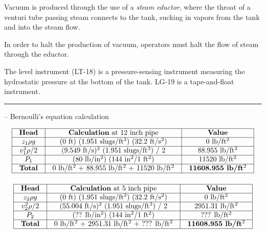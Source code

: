 Vacuum is produced through the use of a {\it steam eductor}, where the throat of a venturi tube passing steam connects to the tank, sucking in vapors from the tank and into the steam flow.  

\vskip 10pt

In order to halt the production of vacuum, operators must halt the flow of steam through the eductor.

\vskip 10pt

The level instrument (LT-18) is a pressure-sensing instrument measuring the hydrostatic pressure at the bottom of the tank.  LG-19 is a tape-and-float instrument.


\filbreak \vskip 5pt \hrule \vskip 5pt  -- Bernoulli's equation calculation \vskip 10pt


$$\vbox{\offinterlineskip
\halign{\strut
\vrule \quad\hfil # \ \hfil & 
\vrule \quad\hfil # \ \hfil & 
\vrule \quad\hfil # \ \hfil \vrule \cr
\noalign{\hrule}
%
{\bf Head} & {\bf Calculation} at 12 inch pipe & {\bf Value} \cr
%
\noalign{\hrule}
%
$z_1 \rho g$ & (0 ft) (1.951 slugs/ft$^{3}$) (32.2 ft/s$^{2}$) & 0 lb/ft$^{2}$ \cr
%
\noalign{\hrule}
%
$v_1^2 \rho / 2$ & (9.549 ft/s)$^{2}$ (1.951 slugs/ft$^{3}$) / 2 & 88.955 lb/ft$^{2}$ \cr
%
\noalign{\hrule}
%
$P_1$ & (80 lb/in$^{2}$) (144 in$^{2}$/1 ft$^{2}$) & 11520 lb/ft$^{2}$ \cr
%
\noalign{\hrule}
%
{\bf Total} &  0 lb/ft$^{2}$ + 88.955 lb/ft$^{2}$ + 11520 lb/ft$^{2}$ & {\bf 11608.955 lb/ft$^{2}$} \cr
%
\noalign{\hrule}
} %
}$$ %

\vskip 10pt


$$\vbox{\offinterlineskip
\halign{\strut
\vrule \quad\hfil # \ \hfil & 
\vrule \quad\hfil # \ \hfil & 
\vrule \quad\hfil # \ \hfil \vrule \cr
\noalign{\hrule}
%
{\bf Head} & {\bf Calculation} at 5 inch pipe & {\bf Value} \cr
%
\noalign{\hrule}
%
$z_2 \rho g$ & (0 ft) (1.951 slugs/ft$^{3}$) (32.2 ft/s$^{2}$) & 0 lb/ft$^{2}$ \cr
%
\noalign{\hrule}
%
$v_2^2 \rho / 2$ & (55.004 ft/s)$^{2}$ (1.951 slugs/ft$^{3}$) / 2 & 2951.31 lb/ft$^{2}$ \cr
%
\noalign{\hrule}
%
$P_2$ & (?? lb/in$^{2}$) (144 in$^{2}$/1 ft$^{2}$) & ??? lb/ft$^{2}$ \cr
%
\noalign{\hrule}
%
{\bf Total} &  0 lb/ft$^{2}$ + 2951.31 lb/ft$^{2}$ + ??? lb/ft$^{2}$ & {\bf 11608.955 lb/ft$^{2}$} \cr
%
\noalign{\hrule}
} %
}$$ %

